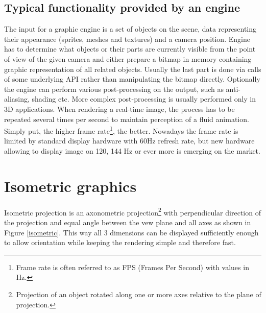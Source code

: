 \documentclass[11pt,oneside, final]{fithesis2}
\begin{document}
\subsection{Typical functionality provided by an engine}
The input for a graphic engine is a set of objects on the scene, data representing their appearance (sprites, meshes and textures) and a camera position. Engine has to determine what objects or their parts are currently visible from the point of view of the given camera and either prepare a bitmap in memory containing graphic representation of all related objects. Usually the last part is done via calls of some underlying API rather than manipulating the bitmap directly. Optionally the engine can perform various post-processing on the output, such as anti-aliasing, shading etc. More complex post-processing is usually performed only in 3D applications. When rendering a real-time image, the process has to be repeated several times per second to maintain perception of a fluid animation. Simply put, the higher frame rate\footnote{Frame rate is often referred to as FPS (Frames Per Second) with values in Hz.}, the better\cite{claypool}. Nowadays the frame rate is limited by standard display hardware with 60Hz refresh rate, but new hardware allowing to display image on 120, 144 Hz or ever more is emerging on the market.

\section{Isometric graphics}
Isometric projection is an axonometric projection\footnote{Projection of an object rotated along one or more axes relative to the plane of projection\cite{}.} with perpendicular direction of the projection and equal angle between the vew plane and all axes\cite{desai} as shown in Figure \ref{isometric}. This way all 3 dimensions can be displayed sufficiently enough to allow orientation while keeping the rendering simple and therefore fast. 
\end{document}
